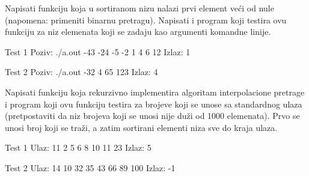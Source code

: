 \begin{Exercise}[label=403]
  Napisati funkciju koja u sortiranom nizu nalazi prvi element ve\' ci
  od nule (napomena: primeniti binarnu pretragu). Napisati i program
  koji testira ovu funkciju za niz elemenata koji se zadaju kao
  argumenti komandne linije.
  
  \begin{maxitest}
    \begin{test}{Test 1}
      Poziv:  ./a.out -43 -24 -5 -2 1 4 6 12
      Izlaz:  1
    \end{test}
  \end{maxitest}
  
  \begin{miditest}
    \begin{test}{Test 2}
      Poziv:  ./a.out -32 4 65 123
      Izlaz:  4
    \end{test}
  \end{miditest}
  
\end{Exercise}

\begin{Exercise}[label=404]
  Napisati funkciju koja rekurzivno implementira algoritam
  interpolacione pretrage i program koji ovu funkciju testira za
  brojeve koji se unose sa standardnog ulaza (pretpostaviti da niz
  brojeva koji se unosi nije du\v{z}i od 1000 elemenata). Prvo se
  unosi broj koji se tra\v zi, a zatim sortirani elementi niza sve do
  kraja ulaza.
  
  \begin{miditest}
    \begin{test}{Test 1}
      Ulaz:   11 2 5 6 8 10 11 23
      Izlaz:  5
    \end{test}
  \end{miditest}
  
  \begin{miditest}
    \begin{test}{Test 2}
      Ulaz:   14 10 32 35 43 66 89 100
      Izlaz:  -1  
    \end{test}
  \end{miditest}
  
\end{Exercise}

